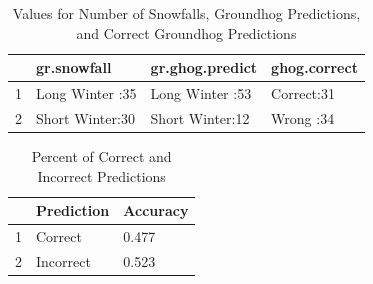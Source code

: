 \documentclass[12pt]{article}\usepackage[]{graphicx}\usepackage[]{color}
\begin{document}
\newpage
\begin{table}[ht]
\centering
\begin{tabular}{rlll}
  \hline
 &       gr.snowfall &     gr.ghog.predict &  ghog.correct \\ 
  \hline
1 & Long Winter :35   & Long Winter :53   & Correct:31   \\ 
  2 & Short Winter:30   & Short Winter:12   & Wrong  :34   \\ 
   \hline
\end{tabular}
\caption{Values for Number of Snowfalls, Groundhog Predictions, and Correct Groundhog Predictions} 
\end{table}
\begin{table}[ht]
\centering
\begin{tabular}{rll}
  \hline
 & Prediction & Accuracy \\ 
  \hline
1 & Correct & 0.477 \\ 
  2 & Incorrect & 0.523 \\ 
   \hline
\end{tabular}
\caption{Percent of Correct and Incorrect Predictions} 
\end{table}



 
 
 
\end{document}
